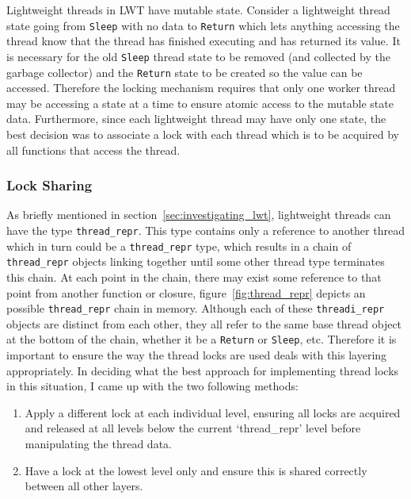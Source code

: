 \documentclass[12pt,twoside,notitlepage]{report}
\begin{document}
%
%
Lightweight threads in LWT have mutable state. Consider a lightweight thread state going from {\tt Sleep} with no data to {\tt Return} which lets anything accessing the thread know that the thread has finished executing and has returned its value. It is necessary for
the old {\tt Sleep} thread state to be removed (and collected by the garbage collector) and the {\tt Return} state to be created so the value can be accessed. Therefore the locking mechanism requires that only one worker thread may be
accessing a state at a time to ensure atomic access to the mutable state data. Furthermore, since each lightweight thread may have only one state, the best decision was to associate a lock with each thread
which is to be acquired by all functions that access the thread. 

%
%
\subsubsection{Lock Sharing}
\label{subsubsec:lock_sharing}
As briefly mentioned in section~\ref{sec:investigating_lwt}, lightweight threads can have the type {\tt thread\_repr}. This type contains only a reference to another thread which in turn could be a {\tt thread\_repr} type, which results in a
chain of {\tt thread\_repr} objects linking together until some other thread type terminates this chain. At each point in the chain, there may exist some reference to that point from another function or closure,
figure~\ref{fig:thread_repr} depicts an possible {\tt thread\_repr} chain in memory. Although each of these {\tt threadi\_repr} objects are distinct from each other, they all refer to the same base thread object at the bottom of the
chain, whether it be a {\tt Return} or {\tt Sleep}, etc. Therefore it is important to ensure the way the thread locks are used deals with this layering appropriately. In deciding what the best approach for implementing thread locks in
this situation, I came up with the two following methods:

\begin{enumerate}
\item Apply a different lock at each individual level, ensuring all locks are acquired and released at all levels below the current `thread\_repr' level before manipulating the thread data.
\item Have a lock at the lowest level only and ensure this is shared correctly between all other layers.
\end{enumerate}
\end{document}
